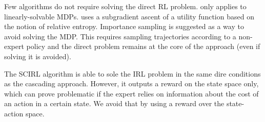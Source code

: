 \documentclass[11pt]{article}
\begin{document}
Few algorithms do not require solving the direct RL problem. \cite{Dvij:2010} only applies to linearly-solvable MDPs.
\cite{boularias:2011} uses a subgradient ascent of a utility function based on the notion of relative entropy. Importance sampling is suggested as a way to avoid solving the MDP. This requires sampling trajectories according to a non-expert policy and
the direct problem remains at the core of the approach (even if
solving it is avoided).

The SCIRL algorithm \cite{klein2012scirl} is able to sole the IRL problem in the same dire conditions as the cascading approach. However, it outputs a reward on the state space only, which can prove problematic if the expert relies on information about the cost of an action in a certain state. We avoid that by using a reward over the state-action space.



\end{document}
